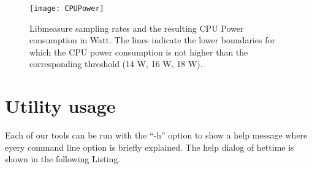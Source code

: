 \begin{figure}[!h]
\begin{center}
\texttt{[image: CPUPower]} 
\caption{Libmeasure sampling rates and the resulting CPU Power consumption in Watt. The lines indicate the lower boundaries for which the CPU power consumption is not higher than the corresponding threshold (14 W, 16 W, 18 W).}
\label{fig:CPUPower}
\end{center}
\end{figure}

\clearpage
\section{Utility usage}
\label{app:manpage}
Each of our tools can be run with the ``-h'' option to show a help message where eyery command line option is briefly explained. The help dialog of hettime is shown in the following Listing. 

